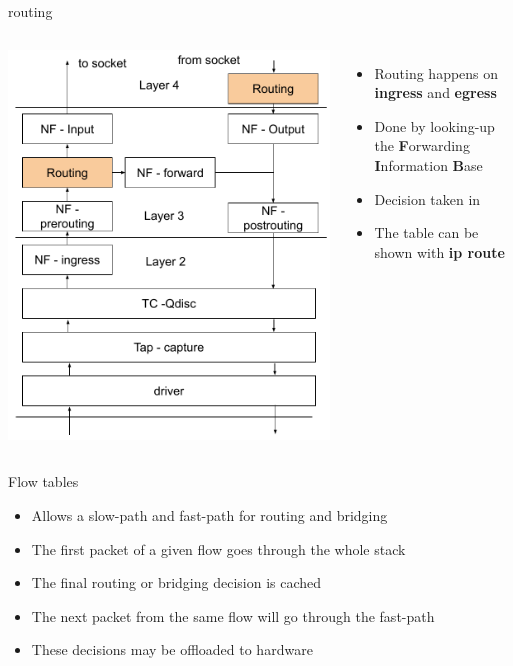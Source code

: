 \begin{frame}{routing}
	\begin{columns}
		\includegraphics[width=1\textwidth]{slides/networking-skb/routing.pdf}
		\begin{itemize}
			\item Routing happens on \textbf{ingress} and \textbf{egress}
			\item Done by looking-up the \textbf{F}orwarding \textbf{I}nformation \textbf{B}ase
			\item Decision taken in 
			\item The table can be shown with \textbf{ip route}
		\end{itemize}
	\end{columns}
\end{frame}

\begin{frame}{Flow tables}
	\begin{itemize}
		\item Allows a slow-path and fast-path for routing and bridging
		\item The first packet of a given flow goes through the whole stack
		\item The final routing or bridging decision is cached
		\item The next packet from the same flow will go through the fast-path
		\item These decisions may be offloaded to hardware
	\end{itemize}
\end{frame}


